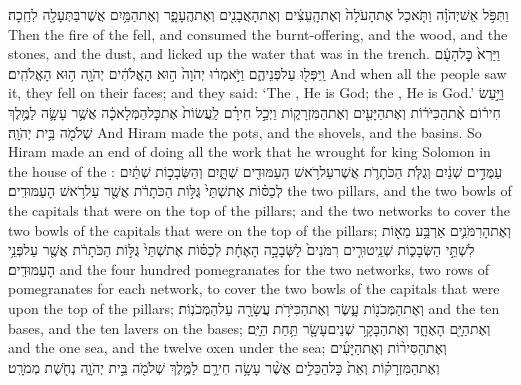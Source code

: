 {וַתִּפֹּ֣ל אֵשׁ\maqqaf יְהֹוָ֗ה וַתֹּ֤אכַל אֶת\maqqaf הָעֹלָה֙ וְאֶת\maqqaf הָֽעֵצִ֔ים וְאֶת\maqqaf הָאֲבָנִ֖ים וְאֶת\maqqaf הֶֽעָפָ֑ר וְאֶת\maqqaf הַמַּ֥יִם אֲשֶׁר\maqqaf בַּתְּעָלָ֖ה לִחֵֽכָה׃}
{Then the fire of the \lord\space fell, and consumed the burnt-offering, and the wood, and the stones, and the dust, and licked up the water that was in the trench.}
{וַיַּרְא֙ כׇּל\maqqaf הָעָ֔ם וַֽיִּפְּל֖וּ עַל\maqqaf פְּנֵיהֶ֑ם וַיֹּ֣אמְר֔וּ יְהֹוָה֙ ה֣וּא הָאֱלֹהִ֔ים יְהֹוָ֖ה ה֥וּא הָאֱלֹהִֽים׃}
{And when all the people saw it, they fell on their faces; and they said: ‘The \lord, He is God; the \lord, He is God.’}
\label{haft_22}
\setcounter{chap}{7}
\setcounter{verse}{40}
{וַיַּ֣עַשׂ חִיר֔וֹם אֶ֨ת\maqqaf הַכִּיֹּר֔וֹת וְאֶת\maqqaf הַיָּעִ֖ים וְאֶת\maqqaf הַמִּזְרָק֑וֹת וַיְכַ֣ל חִירָ֗ם לַֽעֲשׂוֹת֙ אֶת\maqqaf כׇּל\maqqaf הַמְּלָאכָ֔ה אֲשֶׁ֥ר עָשָׂ֛ה לַמֶּ֥לֶךְ שְׁלֹמֹ֖ה בֵּ֥ית יְהֹוָֽה׃}
{And Hiram made the pots, and the shovels, and the basins. So Hiram made an end of doing all the work that he wrought for king Solomon in the house of the \lord:}
{עַמֻּדִ֣ים שְׁנַ֔יִם וְגֻלֹּ֧ת הַכֹּתָרֹ֛ת אֲשֶׁר\maqqaf עַל\maqqaf רֹ֥אשׁ הָעַמּוּדִ֖ים שְׁתָּ֑יִם וְהַשְּׂבָכ֣וֹת שְׁתַּ֔יִם לְכַסּ֗וֹת אֶת\maqqaf שְׁתֵּי֙ גֻּלּ֣וֹת הַכֹּתָרֹ֔ת אֲשֶׁ֖ר עַל\maqqaf רֹ֥אשׁ הָעַמּוּדִֽים׃}
{the two pillars, and the two bowls of the capitals that were on the top of the pillars; and the two networks to cover the two bowls of the capitals that were on the top of the pillars;}
{וְאֶת\maqqaf הָרִמֹּנִ֛ים אַרְבַּ֥ע מֵא֖וֹת לִשְׁתֵּ֣י הַשְּׂבָכ֑וֹת שְׁנֵֽי\maqqaf טוּרִ֤ים רִמֹּנִים֙ לַשְּׂבָכָ֣ה הָאֶחָ֔ת לְכַסּ֗וֹת אֶת\maqqaf שְׁתֵּי֙ גֻּלּ֣וֹת הַכֹּתָרֹ֔ת אֲשֶׁ֖ר עַל\maqqaf פְּנֵ֥י הָעַמּוּדִֽים׃}
{and the four hundred pomegranates for the two networks, two rows of pomegranates for each network, to cover the two bowls of the capitals that were upon the top of the pillars;}
{וְאֶת\maqqaf הַמְּכֹנ֖וֹת עָ֑שֶׂר וְאֶת\maqqaf הַכִּיֹּרֹ֥ת עֲשָׂרָ֖ה עַל\maqqaf הַמְּכֹנֽוֹת׃}
{and the ten bases, and the ten lavers on the bases;}
{וְאֶת\maqqaf הַיָּ֖ם הָאֶחָ֑ד וְאֶת\maqqaf הַבָּקָ֥ר שְׁנֵים\maqqaf עָשָׂ֖ר תַּ֥חַת הַיָּֽם׃}
{and the one sea, and the twelve oxen under the sea;}
{וְאֶת\maqqaf הַסִּיר֨וֹת וְאֶת\maqqaf הַיָּעִ֜ים וְאֶת\maqqaf הַמִּזְרָק֗וֹת וְאֵת֙ כׇּל\maqqaf הַכֵּלִ֣ים  אֲשֶׁ֨ר עָשָׂ֥ה חִירָ֛ם לַמֶּ֥לֶךְ שְׁלֹמֹ֖ה בֵּ֣ית יְהֹוָ֑ה נְחֹ֖שֶׁת מְמֹרָֽט׃}
